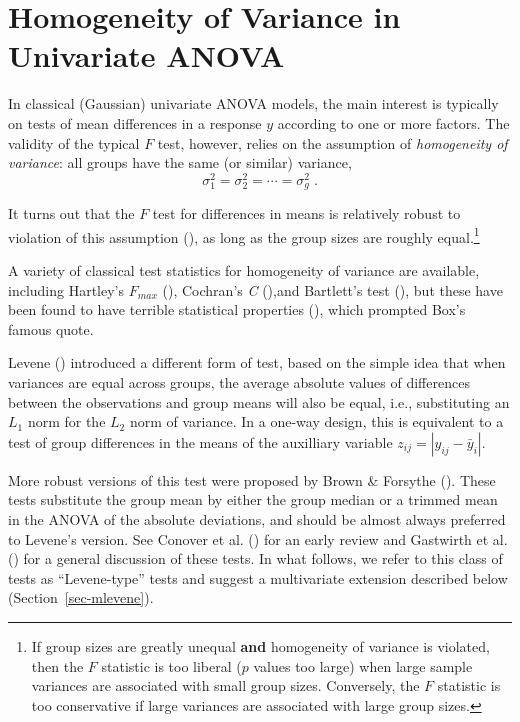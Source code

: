 \documentclass[
  letterpaper,
  10pt,
  krantz2]{krantz}
\begin{document}
\section{Homogeneity of Variance in Univariate
ANOVA}\label{sec-homogeneity-ANOVA}

In classical (Gaussian) univariate ANOVA models, the main interest is
typically on tests of mean differences in a response \(y\) according to
one or more factors. The validity of the typical \(F\) test, however,
relies on the assumption of \emph{homogeneity of variance}: all groups
have the same (or similar) variance, \[
\sigma_1^2 = \sigma_2^2 = \cdots = \sigma_g^2 \; .
\]

It turns out that the \(F\) test for differences in means is relatively
robust to violation of this assumption
(), as long as the
group sizes are roughly equal.\footnote{If group sizes are greatly
  unequal \textbf{and} homogeneity of variance is violated, then the
  \(F\) statistic is too liberal (\(p\) values too large) when large
  sample variances are associated with small group sizes. Conversely,
  the \(F\) statistic is too conservative if large variances are
  associated with large group sizes.}

A variety of classical test statistics for homogeneity of variance are
available, including Hartley's \(F_{max}\)
(), Cochran's \emph{C}
(),and Bartlett's test
(), but these have been
found to have terrible statistical properties
(), which prompted
Box's famous quote.

Levene () introduced a different form of
test, based on the simple idea that when variances are equal across
groups, the average absolute values of differences between the
observations and group means will also be equal, i.e., substituting an
\(L_1\) norm for the \(L_2\) norm of variance. In a one-way design, this
is equivalent to a test of group differences in the means of the
auxilliary variable \(z_{ij} = | y_{ij} - \bar{y}_i |\).

More robust versions of this test were proposed by Brown \& Forsythe
(). These tests substitute the
group mean by either the group median or a trimmed mean in the ANOVA of
the absolute deviations, and should be almost always preferred to
Levene's version. See Conover et al.
() for an early review and
Gastwirth et al. () for a
general discussion of these tests. In what follows, we refer to this
class of tests as ``Levene-type'' tests and suggest a multivariate
extension described below (Section~\ref{sec-mlevene}).
\end{document}
